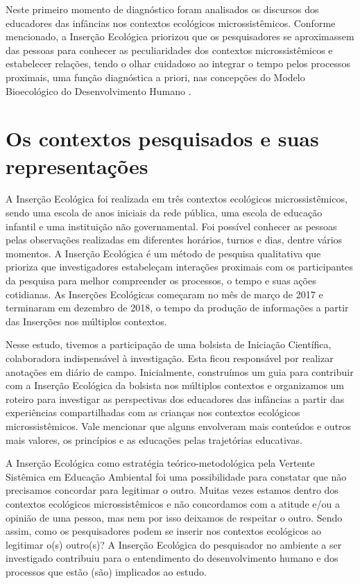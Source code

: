 \documentclass{textolivre}
\begin{document}
Neste primeiro momento de diagnóstico foram analisados os discursos dos educadores das infâncias nos contextos ecológicos microssistêmicos. Conforme mencionado, a Inserção Ecológica priorizou que os pesquisadores se aproximassem das pessoas para conhecer as peculiaridades dos contextos microssistêmicos e estabelecer relações, tendo o olhar cuidadoso ao integrar o tempo pelos processos proximais, uma função diagnóstica a priori, nas concepções do Modelo Bioecológico do Desenvolvimento Humano \cite{brofen2011}.



\section{Os contextos pesquisados e suas representações}\label{sec-contextos}
A Inserção Ecológica foi realizada em três contextos ecológicos microssistêmicos, sendo uma escola de anos iniciais da rede pública, uma escola de educação infantil e uma instituição não governamental. Foi possível conhecer as pessoas pelas observações realizadas em diferentes horários, turnos e dias, dentre vários momentos. A Inserção Ecológica \cite{piske2018c,koller2016,silveira2009} é um método de pesquisa qualitativa que prioriza que investigadores estabeleçam interações proximais com os participantes da pesquisa para melhor compreender os processos, o tempo e suas ações cotidianas. As Inserções Ecológicas começaram no mês de março de 2017 e terminaram em dezembro de 2018, o tempo da produção de informações a partir das Inserções nos múltiplos contextos.

Nesse estudo, tivemos a participação de uma bolsista de Iniciação Científica, colaboradora indispensável à investigação. Esta ficou responsável por realizar anotações em diário de campo. Inicialmente, construímos um guia para contribuir com a Inserção Ecológica da bolsista nos múltiplos contextos e organizamos um roteiro para investigar as perspectivas dos educadores das infâncias a partir das experiências compartilhadas com as crianças nos contextos ecológicos microssistêmicos. Vale mencionar que alguns envolveram mais conteúdos e outros mais valores, os princípios e as educações pelas trajetórias educativas.

A Inserção Ecológica como estratégia teórico-metodológica pela Vertente Sistêmica em Educação Ambiental foi uma possibilidade para constatar que não precisamos concordar para legitimar o outro. Muitas vezes estamos dentro dos contextos ecológicos microssistêmicos e não concordamos com a atitude e/ou a opinião de uma pessoa, mas nem por isso deixamos de respeitar o outro. Sendo assim, como os pesquisadores podem se inserir nos contextos ecológicos ao legitimar o(s) outro(s)? A Inserção Ecológica do pesquisador no ambiente a ser investigado contribuiu para o entendimento do desenvolvimento humano e dos processos que estão (são) implicados ao estudo. 
\end{document}
